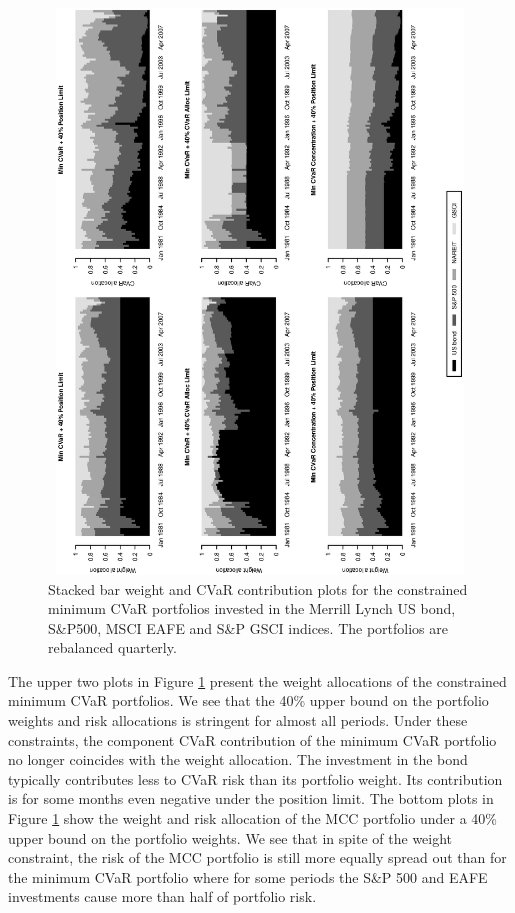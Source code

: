 \documentclass[12pt,a4paper]{article}
\begin{document}
\begin{figure}[tb]
\caption{Stacked bar weight and CVaR contribution plots for the constrained minimum CVaR portfolios invested in the Merrill Lynch US bond, S\&P500, MSCI EAFE and S\&P GSCI indices. The portfolios are rebalanced quarterly.\label{fig:MinCVaR_alternatives}}
\includegraphics[width=12cm,height=15cm,angle=270]{MinCVaR_alternatives_CC.eps}
\end{figure}


The upper two plots in Figure \ref{fig:MinCVaR_alternatives} present the weight allocations of the constrained minimum CVaR portfolios. We see that the 40\% upper bound on the portfolio weights and risk allocations is stringent for almost all periods. Under these constraints, the component CVaR contribution of the minimum CVaR portfolio no longer coincides with the weight allocation. The investment in the bond typically contributes less to CVaR risk than its portfolio weight. Its contribution is for some months even negative under the position limit. The bottom plots in Figure \ref{fig:MinCVaR_alternatives} show the weight and risk allocation of the MCC portfolio under a 40\% upper bound on the portfolio weights.  We see that in spite of the weight constraint, the risk of the MCC portfolio is still more equally spread out than for the minimum CVaR portfolio where for some periods the S\&P 500 and EAFE investments cause more than half of portfolio risk.
\end{document}

